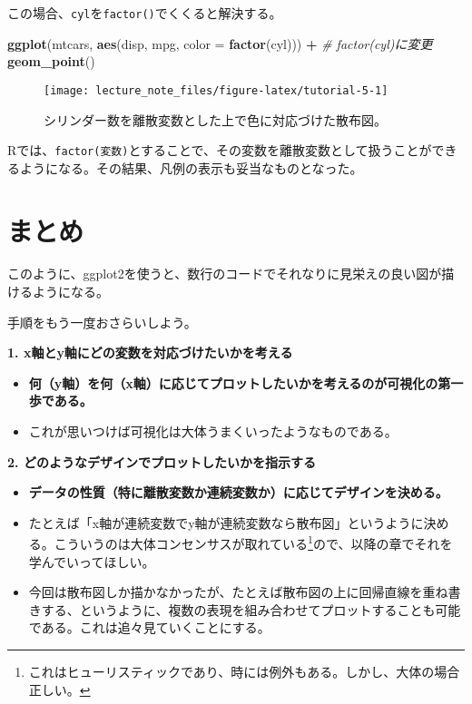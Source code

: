 \documentclass[]{book}
\newenvironment{Shaded}{\begin{snugshade}}{\end{snugshade}}
\newcommand{\KeywordTok}[1]{\textcolor[rgb]{0.13,0.29,0.53}{\textbf{#1}}}
\newcommand{\DataTypeTok}[1]{\textcolor[rgb]{0.13,0.29,0.53}{#1}}
\newcommand{\StringTok}[1]{\textcolor[rgb]{0.31,0.60,0.02}{#1}}
\newcommand{\CommentTok}[1]{\textcolor[rgb]{0.56,0.35,0.01}{\textit{#1}}}
\newcommand{\OperatorTok}[1]{\textcolor[rgb]{0.81,0.36,0.00}{\textbf{#1}}}
\newcommand{\NormalTok}[1]{#1}
\let\rmarkdownfootnote\footnote%
\def\footnote{\protect\rmarkdownfootnote}
\begin{document}
この場合、\texttt{cyl}を\texttt{factor()}でくくると解決する。



\begin{Shaded}
\begin{Highlighting}[]
\KeywordTok{ggplot}\NormalTok{(mtcars, }\KeywordTok{aes}\NormalTok{(disp, mpg, }\DataTypeTok{color =} \KeywordTok{factor}\NormalTok{(cyl))) }\OperatorTok{+}\StringTok{ }\CommentTok{# factor(cyl)に変更}
\StringTok{  }\KeywordTok{geom_point}\NormalTok{()}
\end{Highlighting}
\end{Shaded}

\begin{figure}

{\centering \texttt{[image: lecture\_note\_files/figure-latex/tutorial-5-1]} 

}

\caption{シリンダー数を離散変数とした上で色に対応づけた散布図。}\label{fig:tutorial-5}
\end{figure}

Rでは、\texttt{factor(変数)}とすることで、その変数を離散変数として扱うことができるようになる。その結果、凡例の表示も妥当なものとなった。

\section{まとめ}

このように、ggplot2を使うと、数行のコードでそれなりに見栄えの良い図が描けるようになる。

手順をもう一度おさらいしよう。

\textbf{1. x軸とy軸にどの変数を対応づけたいかを考える}

\begin{itemize}
\item
  \textbf{何（y軸）を何（x軸）に応じてプロットしたいかを考えるのが可視化の第一歩である。}
\item
  これが思いつけば可視化は大体うまくいったようなものである。
\end{itemize}

\textbf{2. どのようなデザインでプロットしたいかを指示する}

\begin{itemize}
\item
  \textbf{データの性質（特に離散変数か連続変数か）に応じてデザインを決める。}
\item
  たとえば「x軸が連続変数でy軸が連続変数なら散布図」というように決める。こういうのは大体コンセンサスが取れている\footnote{これはヒューリスティックであり、時には例外もある。しかし、大体の場合正しい。}ので、以降の章でそれを学んでいってほしい。
\item
  今回は散布図しか描かなかったが、たとえば散布図の上に回帰直線を重ね書きする、というように、複数の表現を組み合わせてプロットすることも可能である。これは追々見ていくことにする。
\end{itemize}
\end{document}
